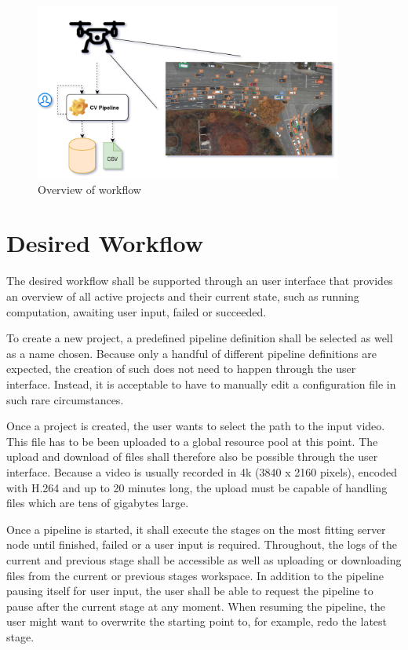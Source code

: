 \begin{figure}[H]
	\centering
	\includegraphics[width=0.9\textwidth]{overview_3.png}
	\caption{Overview of workflow}
\end{figure}

\section{Desired Workflow}
\label{workflow}
\label{workflow:desired:docker}

The desired workflow shall be supported through an user interface that provides an overview of all active projects and their current state, such as running computation, awaiting user input, failed or succeeded.

To create a new project, a predefined pipeline definition shall be selected as well as a name chosen.
Because only a handful of different pipeline definitions are expected, the creation of such does not need to happen through the user interface.
Instead, it is acceptable to have to manually edit a configuration file in such rare circumstances.

Once a project is created, the user wants to select the path to the input video.
This file has to be been uploaded to a global resource pool at this point.
The upload and download of files shall therefore also be possible through the user interface.
Because a video is usually recorded in 4k (3840 x 2160 pixels), encoded with H.264 and up to 20 minutes long, the upload must be capable of handling files which are tens of gigabytes large.

Once a pipeline is started, it shall execute the stages on the most fitting server node until finished, failed or a user input is required.
Throughout, the logs of the current and previous stage shall be accessible as well as uploading or downloading files from the current or previous stages workspace.
In addition to the pipeline pausing itself for user input, the user shall be able to request the pipeline to pause after the current stage at any moment.
When resuming the pipeline, the user might want to overwrite the starting point to, for example, redo the latest stage.

